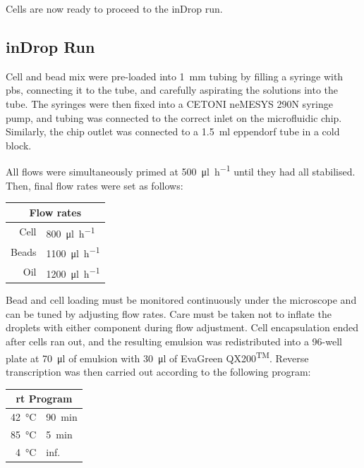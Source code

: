 \begin{appendix}
\begin{multicols}{2}
Cells are now ready to proceed to the inDrop run.

\subsection{inDrop Run}
Cell and bead mix were pre-loaded into \SI{1}{\mm} tubing by filling a syringe with \acrshort{pbs}, connecting it to the tube, and carefully aspirating the solutions into the tube. The syringes were then fixed into a CETONI neMESYS 290N syringe pump, and tubing was connected to the correct inlet on the microfluidic chip. Similarly, the chip outlet was connected to a \SI{1.5}{\ml} eppendorf tube in a cold block.\pms

All flows were simultaneously primed at \SI{500}{\ul\per\hour} until they had all stabilised. Then, final flow rates were set as follows:\pms

\begin{center}
\begin{tabular}{r|l}
	\multicolumn{2}{c}{Flow rates} \\
	\hline
	Cell & \SI{800}{\ul\per\hour} \\
	Beads & \SI{1100}{\ul\per\hour} \\
	Oil & \SI{1200}{\ul\per\hour} \\
\end{tabular}
\end{center}
\medskip

Bead and cell loading must be monitored continuously under the microscope and can be tuned by adjusting flow rates. Care must be taken not to inflate the droplets with either component during flow adjustment. Cell encapsulation ended after cells ran out, and the resulting emulsion was redistributed into a 96-well plate at \SI{70}{\ul} of emulsion with \SI{30}{\ul} of EvaGreen QX200\textsuperscript{TM}. Reverse transcription was then carried out according to the following program:\pms

\begin{center}
\begin{tabular}{r|l}
	\multicolumn{2}{c}{\acrshort{rt} Program} \\
	\hline
	\SI{42}{\celsius} & \SI{90}{\minute} \\
	\SI{85}{\celsius} & \SI{5}{\minute} \\
	\SI{4}{\celsius} & inf. \\
\end{tabular}
\end{center}
\medskip


\end{multicols}
\end{appendix}
